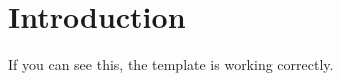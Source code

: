 \documentclass[12pt]{article}
\begin{document}

\section{Introduction}

If you can see this, the template is working correctly.
\end{document}

